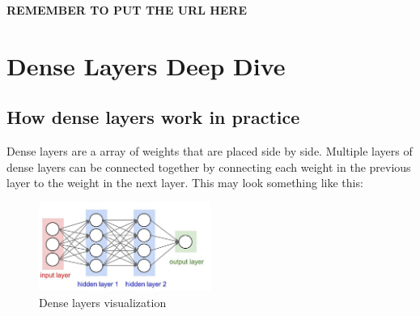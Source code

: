 \documentclass[11pt]{report}
\begin{document}
\textbf{REMEMBER TO PUT THE URL HERE}

\pagebreak

\chapter{Dense Layers Deep Dive}
\section{How dense layers work in practice}
Dense layers are a array of weights that are placed side by side. Multiple layers of dense layers can be connected together by connecting each weight in the previous layer to the weight in the next layer. This may look something like this:

    \begin{figure}[h]
        \begin{center}
        \includegraphics[width=0.5\textwidth]{denselayers.jpeg}
        \caption{Dense layers visualization}
        \label{fig:dense_layers}
        \end{center}
    \end{figure}
\end{document}
